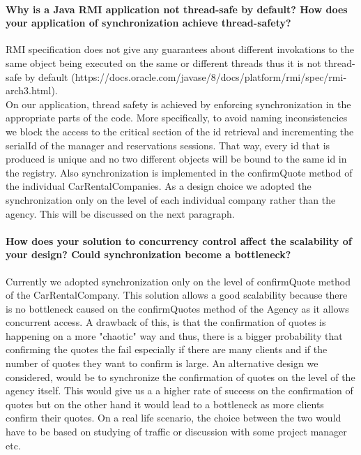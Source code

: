 \documentclass{ds-report}
\begin{document}
		
	\paragraph{Why is a Java RMI application not thread-safe by default? How does your application of synchronization achieve thread-safety?\\}
    RMI specification does not give any guarantees about different invokations to the same object being executed on the same or different threads
    thus it is not thread-safe by default (https://docs.oracle.com/javase/8/docs/platform/rmi/spec/rmi-arch3.html). \\
    On our application, thread safety is achieved by enforcing synchronization in the appropriate parts of the code. More specifically, to avoid
    naming inconsistencies we block the access to the critical section of the id retrieval and incrementing the serialId of the manager and reservations sessions.
    That way, every id that is produced is unique and no two different objects will be bound to the same id in the registry.
    Also synchronization is implemented in the confirmQuote method of the individual CarRentalCompanies. As a design choice we adopted
    the synchronization only on the level of each individual company rather than the agency. This will be discussed on the next paragraph.

	\paragraph{How does your solution to concurrency control affect the scalability of your design? Could synchronization become a bottleneck?\\}
    Currently we adopted synchronization only on the level of confirmQuote method of the CarRentalCompany. This solution allows a
    good scalability because there is no bottleneck caused on the confirmQuotes method of the Agency as it allows concurrent access.
    A drawback of this, is that the confirmation of quotes is happening on a more "chaotic" way and thus, there is a bigger probability
    that confirming the quotes the fail especially if there are many clients and if the number of quotes they want to confirm is large.
    An alternative design we considered, would be to synchronize the confirmation of quotes on the level of the agency itself. This
    would give us a a higher rate of success on the confirmation of quotes but on the other hand it would lead to a bottleneck as
    more clients confirm their quotes.
    On a real life scenario, the choice between the two would have to be based on studying of traffic or discussion with some project
    manager etc.
	
	\clearpage

	
	
\end{document}
